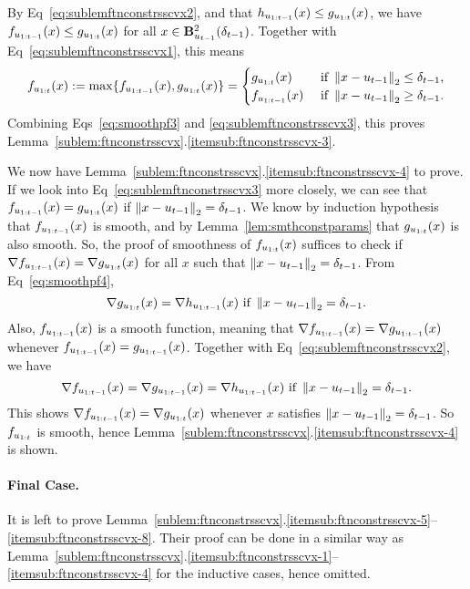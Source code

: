 By Eq~\eqref{eq:sublemftnconstrsscvx2}, and that $h_{u_{1:{t-1}}}(x) \leq g_{u_{1:{t}}}(x)$,
we have $f_{u_{1:{t-1}}}(x) \leq g_{u_{1:{t}}}(x)$ for all $x \in \mathbf{B}^2_{u_{t-1}}({\delta_{t-1}})$.
Together with Eq~\eqref{eq:sublemftnconstrsscvx1}, this means 
\begin{equation}
\label{eq:sublemftnconstrsscvx3}
	f_{u_{1:{t}}}(x) := \max \{ f_{u_{1:{t-1}}} (x), g_{u_{1:{t}}}(x) \}
	= \begin{cases}
		g_{u_{1:{t}}}(x) & \text{ if } \left\|{x - u_{t-1}}\right\|_2 \leq \delta_{t-1},\\
		f_{u_{1:{t-1}}}(x) & \text{ if } \left\|{x - u_{t-1}}\right\|_2 \geq \delta_{t-1}.
	\end{cases}
\end{equation}
Combining Eqs~\eqref{eq:smoothpf3} and \eqref{eq:sublemftnconstrsscvx3}, this proves Lemma~\ref{sublem:ftnconstrsscvx}.\ref{itemsub:ftnconstrsscvx-3}.

We now have Lemma~\ref{sublem:ftnconstrsscvx}.\ref{itemsub:ftnconstrsscvx-4} to prove.
If we look into Eq~\eqref{eq:sublemftnconstrsscvx3} more closely, we can see that 
$f_{u_{1:{t-1}}}(x) = g_{u_{1:{t}}}(x)$ if $\left\|{x - u_{t-1}}\right\|_2 = \delta_{t-1}$.
We know by induction hypothesis that $f_{u_{1:{t-1}}}(x)$ is smooth, and by Lemma~\ref{lem:smthconstparams} that $g_{u_{1:{t}}}(x)$ is also smooth.
So, the proof of smoothness of $f_{u_{1:{t}}}(x)$ suffices to check 
if $\nabla f_{u_{1:{t-1}}}(x) = \nabla g_{u_{1:{t}}}(x)$ for all $x$ such that $\left\|{x - u_{t-1}}\right\|_2 = \delta_{t-1}$.
From Eq~\eqref{eq:smoothpf4},
\begin{equation*}
\nabla g_{u_{1:{t}}}(x) = \nabla h_{u_{1:{t-1}}}(x) \text{ if } \left\|{x - u_{t-1}}\right\|_2 = \delta_{t-1}.
\end{equation*}
Also, $f_{u_{1:{t-1}}}(x)$ is a smooth function, meaning that 
$\nabla f_{u_{1:{t-1}}}(x) = \nabla g_{u_{1:{t-1}}}(x)$ whenever $f_{u_{1:{t-1}}}(x) = g_{u_{1:{t-1}}}(x)$.
Together with Eq~\eqref{eq:sublemftnconstrsscvx2}, we have 
\begin{equation*}
\nabla f_{u_{1:{t-1}}}(x) = \nabla g_{u_{1:{t-1}}}(x) = \nabla h_{u_{1:{t-1}}}(x) \text{ if } \left\|{x - u_{t-1}}\right\|_2 = \delta_{t-1}.
\end{equation*}
This shows $\nabla f_{u_{1:{t-1}}}(x) = \nabla g_{u_{1:{t}}}(x)$ whenever $x$ satisfies $\left\|{x - u_{t-1}}\right\|_2 = \delta_{t-1}$. 
So $f_{u_{1:{t}}}$ is smooth, hence Lemma~\ref{sublem:ftnconstrsscvx}.\ref{itemsub:ftnconstrsscvx-4} is shown.

\paragraph{Final Case.}
It is left to prove Lemma~\ref{sublem:ftnconstrsscvx}.\ref{itemsub:ftnconstrsscvx-5}--\ref{itemsub:ftnconstrsscvx-8}. 
Their proof can be done in a similar way as Lemma~\ref{sublem:ftnconstrsscvx}.\ref{itemsub:ftnconstrsscvx-1}--\ref{itemsub:ftnconstrsscvx-4} for the inductive cases, hence omitted.

